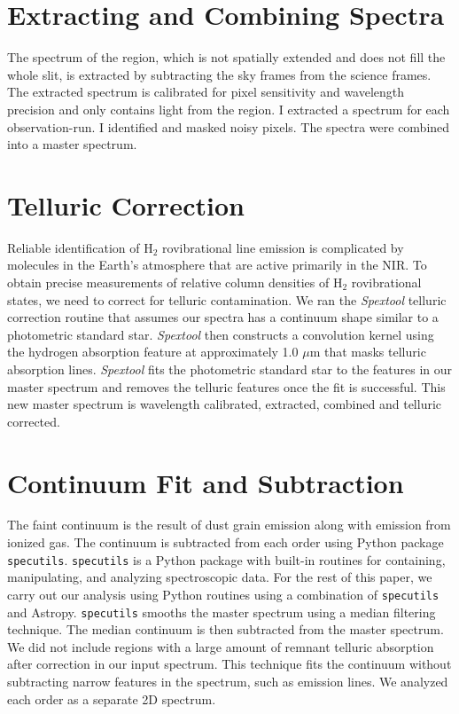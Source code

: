 \documentclass[12pt, letterpaper]{book}
\begin{document}
\section{Extracting and Combining Spectra}
The spectrum of the region, which is not spatially extended and does not fill the whole slit, is extracted by subtracting the sky frames from the science frames. The extracted spectrum is calibrated for pixel sensitivity and wavelength precision and only contains light from the region. I extracted a spectrum for each observation-run. I identified and masked noisy pixels. The spectra were combined into a master spectrum.

\section{Telluric Correction}
Reliable identification of H$_2$ rovibrational line emission is complicated by molecules in the Earth's atmosphere that are active primarily in the NIR. To obtain precise measurements of relative column densities of H$_2$ rovibrational states, we need to correct for telluric contamination. We ran the {\em Spextool} telluric correction routine that assumes our spectra has a continuum shape similar to a photometric standard star. {\em Spextool} then constructs a convolution kernel using the hydrogen absorption feature at approximately 1.0 $\mu$m that masks telluric absorption lines. {\em Spextool} fits the photometric standard star to the features in our master spectrum and removes the telluric features once the fit is successful. This new master spectrum is wavelength calibrated, extracted, combined and telluric corrected.

\section{Continuum Fit and Subtraction}
The faint continuum is the result of dust grain emission along with emission from ionized gas. The continuum is subtracted from each order using Python package \texttt{specutils}. \texttt{specutils} is a Python package with built-in routines for containing, manipulating, and analyzing spectroscopic data. For the rest of this paper, we carry out our analysis using Python routines using a combination of \texttt{specutils} and Astropy.
\texttt{specutils} smooths the master spectrum using a median filtering technique. The median continuum is then subtracted from the master spectrum. We did not include regions with a large amount of remnant telluric absorption after correction in our input spectrum. This technique fits the continuum without subtracting narrow features in the spectrum, such as emission lines. We analyzed each order as a separate 2D spectrum.
\end{document}
